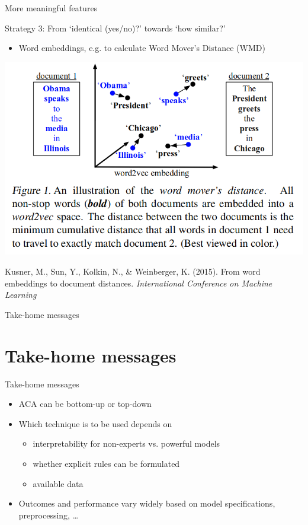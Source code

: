 \documentclass{beamer}
\begin{document}
\begin{frame}{More meaningful features}
\begin{block}{Strategy 3: From `identical (yes/no)?' towards `how similar?'}
	\begin{itemize}
		\item Word embeddings, e.g. to calculate Word Mover's Distance (WMD)
	\end{itemize}
\end{block}
\begin{center}
	\includegraphics[width=0.6\linewidth]{../pictures/wmd}
\end{center}

\tiny{Kusner, M., Sun, Y., Kolkin, N., \& Weinberger, K. (2015). From word embeddings to document distances. \textit{International Conference on Machine Learning}}
\end{frame}



\begin{frame}[plain]
Take-home messages
\end{frame}

\section{Take-home messages}
\begin{frame}{Take-home messages}
\begin{itemize}
	\item ACA can be bottom-up or top-down
	\item Which technique is to be used depends on
	\begin{itemize}
		\item interpretability for non-experts vs. powerful models
		\item whether explicit rules can be formulated
		\item available data
	\end{itemize}
	\item Outcomes and performance vary widely based on model specifications, preprocessing, \ldots
\end{itemize}

\end{frame}
\end{document}
